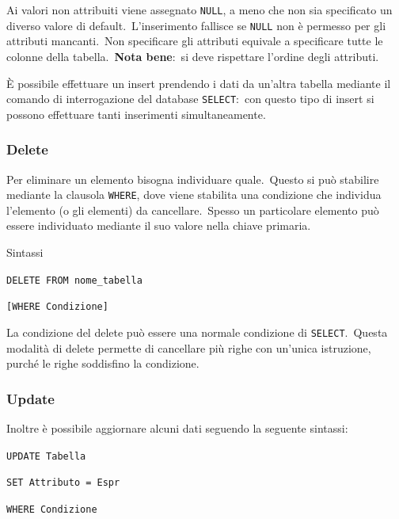 \noindent Ai valori non attribuiti viene assegnato \texttt{NULL}, a meno che non sia specificato un diverso valore di default.\
L'inserimento fallisce se \texttt{NULL} non è permesso per gli attributi mancanti.\
Non specificare gli attributi equivale a specificare tutte le colonne della tabella.\
\textbf{Nota bene}:\ si deve rispettare l'ordine degli attributi.

È possibile effettuare un insert prendendo i dati da un'altra tabella mediante il comando di interrogazione del database \texttt{SELECT}:\ con questo tipo di insert si possono effettuare tanti inserimenti simultaneamente.\

\subsubsection{Delete}

Per eliminare un elemento bisogna individuare quale.\
Questo si può stabilire mediante la clausola \texttt{WHERE}, dove viene stabilita una condizione che individua l'elemento (o gli elementi) da cancellare.\
Spesso un particolare elemento può essere individuato mediante il suo valore nella chiave primaria.

\noindent Sintassi
\begin{flushleft}
	\texttt{DELETE FROM nome\_tabella}

	\texttt{[WHERE Condizione]}
\end{flushleft}

\noindent La condizione del delete può essere una normale condizione di \texttt{SELECT}.\
Questa modalità di delete permette di cancellare più righe con un'unica istruzione, purché le righe soddisfino la condizione.\

\subsubsection{Update}

Inoltre è possibile aggiornare alcuni dati seguendo la seguente sintassi:

\begin{flushleft}
	\texttt{UPDATE Tabella}

	\texttt{SET Attributo = Espr}

	\texttt{WHERE Condizione}
\end{flushleft}
